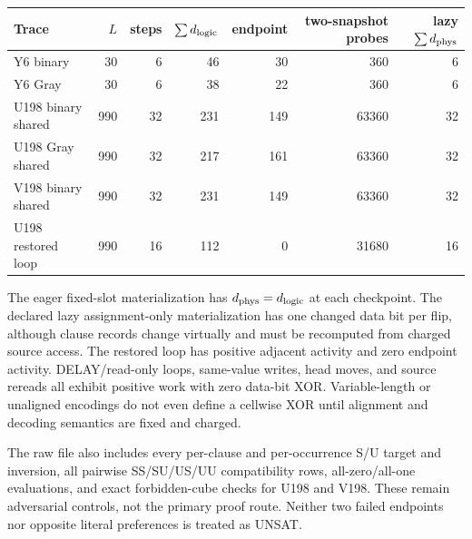 \documentclass[11pt]{article}
\begin{document}
\begin{center}
\begin{tabular}{lrrrrrr}
\toprule
Trace & $L$ & steps & $\sum d_{\rm logic}$ & endpoint & two-snapshot probes & lazy $\sum d_{\rm phys}$\\
\midrule
Y6 binary & 30 & 6 & 46 & 30 & 360 & 6\\
Y6 Gray & 30 & 6 & 38 & 22 & 360 & 6\\
U198 binary shared & 990 & 32 & 231 & 149 & 63360 & 32\\
U198 Gray shared & 990 & 32 & 217 & 161 & 63360 & 32\\
V198 binary shared & 990 & 32 & 231 & 149 & 63360 & 32\\
U198 restored loop & 990 & 16 & 112 & 0 & 31680 & 16\\
\bottomrule
\end{tabular}
\end{center}

The eager fixed-slot materialization has $d_{\rm phys}=d_{\rm logic}$ at each checkpoint.  The declared lazy assignment-only materialization has one changed data bit per flip, although clause records change virtually and must be recomputed from charged source access.  The restored loop has positive adjacent activity and zero endpoint activity.  DELAY/read-only loops, same-value writes, head moves, and source rereads all exhibit positive work with zero data-bit XOR.  Variable-length or unaligned encodings do not even define a cellwise XOR until alignment and decoding semantics are fixed and charged.

The raw file also includes every per-clause and per-occurrence S/U target and inversion, all pairwise SS/SU/US/UU compatibility rows, all-zero/all-one evaluations, and exact forbidden-cube checks for U198 and V198.  These remain adversarial controls, not the primary proof route.  Neither two failed endpoints nor opposite literal preferences is treated as UNSAT.
\end{document}
